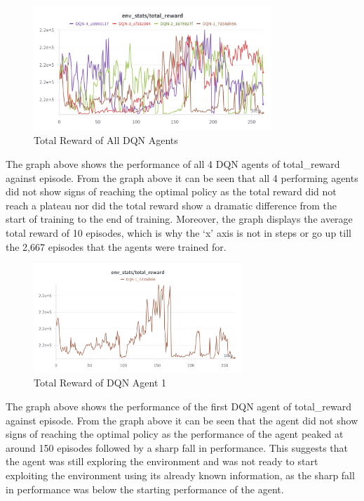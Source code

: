 \begin{figure}[H]
    \centering
    \includegraphics[width=0.8\textwidth]{figures/DQN_TotalReward.png}
    \caption{Total Reward of All DQN Agents}
    \label{fig:agent_eval_all_dqn}
\end{figure}

The graph above shows the performance of all 4 DQN agents of total\_reward against episode. From the graph above it can be seen that all 4 performing agents did not show signs of reaching the optimal policy as the total reward did not reach a plateau nor did the total reward show a dramatic difference from the start of training to the end of training. Moreover, the graph displays the average total reward of 10 episodes, which is why the `x' axis is not in steps or go up till the 2,667 episodes that the agents were trained for.

\begin{figure}[H]
    \centering
    \includegraphics[width=0.7\textwidth]{figures/DQN-1_TotalReward.png}
    \caption{Total Reward of DQN Agent 1}
    \label{fig:agent_eval_dqn_1}
\end{figure}

The graph above shows the performance of the first DQN agent of total\_reward against episode. From the graph above it can be seen that the agent did not show signs of reaching the optimal policy as the performance of the agent peaked at around 150 episodes followed by a sharp fall in performance. This suggests that the agent was still exploring the environment and was not ready to start exploiting the environment using its already known information, as the sharp fall in performance was below the starting performance of the agent.

